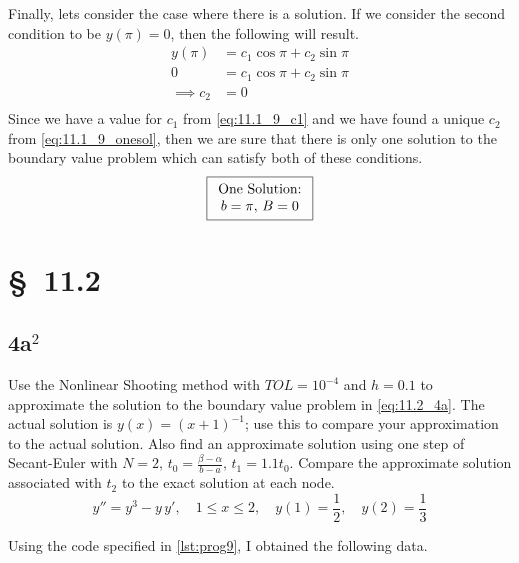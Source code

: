 \documentclass[12pt]{article}
\begin{document}
Finally, lets consider the case where there is a solution. If we
consider the second condition to be $y(\pi)=0$, then the following will
result.
\begin{equation}
  \label{eq:11.1_9_onesol}
  \begin{aligned}
    y(\pi)&=c_1\cos \pi + c_2\sin \pi \\
    0&=c_1\cos \pi + c_2\sin \pi \\
    \implies c_2 &= 0 \\
  \end{aligned}
\end{equation}
Since we have a value for $c_1$ from \cref{eq:11.1_9_c1} and we have
found a unique $c_2$ from \cref{eq:11.1_9_onesol}, then we are sure
that there is only one solution to the boundary value problem which
can satisfy both of these conditions.
\begin{equation*}
\boxed{
  \begin{array}[c]{c}
    \text{One Solution:} \\
    b=\pi,\,B=0 \\
  \end{array}
}
\end{equation*}

\section{\S~11.2}
\subsection{4a$^2$}
Use the Nonlinear Shooting method with $TOL=10^{-4}$ and $h=0.1$ to
approximate the solution to the boundary value problem in
\cref{eq:11.2_4a}. The actual solution is $y(x)=(x+1)^{-1}$; use this
to compare your approximation to the actual solution. Also find an
approximate solution using one step of Secant-Euler with
$N=2,\,t_0=\frac{\beta-\alpha}{b-a},\,t_1=1.1t_0$. Compare the
approximate solution associated with $t_2$ to the exact solution at
each node.
\begin{equation}
  \label{eq:11.2_4a}
  y''=y^3-y\,y',\quad 1\leq x\leq 2,\quad y(1)=\frac{1}{2},\quad 
  y(2)=\frac{1}{3}
\end{equation}


Using the code specified in \cref{lst:prog9}, I obtained the following
data.
\end{document}
